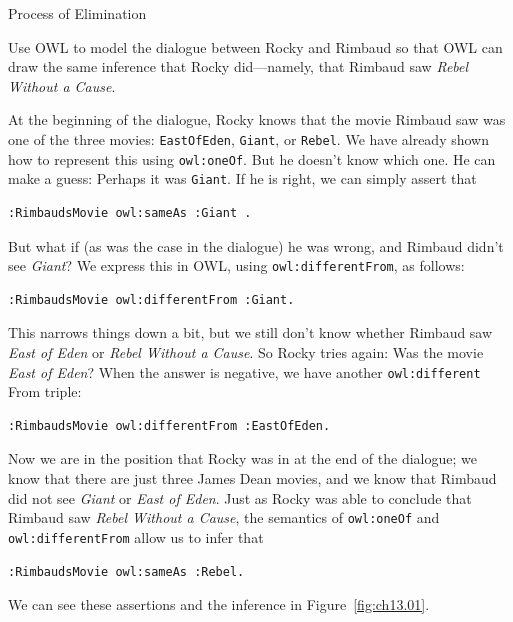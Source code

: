 \begin{challenge}{Process of Elimination}

Use OWL to model the dialogue between Rocky and Rimbaud so that OWL can
draw the same inference that Rocky did---namely, that Rimbaud saw \emph{Rebel
Without a Cause}.

\solution

At the beginning of the dialogue, Rocky knows that the movie Rimbaud saw
was one of the three movies: \texttt{EastOfEden}, \texttt{Giant}, or \texttt{Rebel}. We have
already shown how to represent this using \texttt{owl:oneOf}. But he doesn't know
which one. He can make a guess: Perhaps it was \texttt{Giant}. If he is right, we
can simply assert that

\begin{lstlisting}
:RimbaudsMovie owl:sameAs :Giant .
\end{lstlisting}

But what if (as was the case in the dialogue) he was wrong, and Rimbaud
didn't see \emph{Giant}? We express this in OWL, using \texttt{owl:differentFrom}, as
follows:

\begin{lstlisting}
:RimbaudsMovie owl:differentFrom :Giant.
\end{lstlisting}

This narrows things down a bit, but we still don't know whether Rimbaud
saw \emph{East of Eden} or \emph{Rebel Without a Cause}. So Rocky tries again: Was the
movie \emph{East of Eden}? When the answer is negative, we have another
\texttt{owl:different} From triple:

\begin{lstlisting}
:RimbaudsMovie owl:differentFrom :EastOfEden.
\end{lstlisting}

Now we are in the position that Rocky was in at the end of the dialogue;
we know that there are just three James Dean movies, and we know that
Rimbaud did not see \emph{Giant} or \emph{East of Eden}. Just as Rocky was able to
conclude that Rimbaud saw \emph{Rebel Without a Cause}, the semantics of
\texttt{owl:oneOf} and \texttt{owl:differentFrom} allow us to infer that

\begin{lstlisting}
:RimbaudsMovie owl:sameAs :Rebel.
\end{lstlisting}

We can see these assertions and the inference in Figure~\ref{fig:ch13.01}.
\end{challenge}

